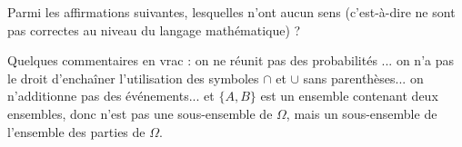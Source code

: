 {\begin{question}
Parmi les affirmations suivantes, lesquelles n'ont aucun sens (c'est-à-dire ne sont pas correctes au niveau du langage mathématique) ?
\begin{answers}
\end{answers}
\begin{explanations}
Quelques commentaires en vrac : on ne réunit pas des probabilités ... on n'a pas le droit d'enchaîner l'utilisation des symboles $\cap$ et $\cup$ sans parenthèses... on n'additionne pas des événements... et $\{ A,B\}$ est un ensemble contenant deux ensembles, donc n'est pas une sous-ensemble de $\Omega$, mais un sous-ensemble de l'ensemble des parties de $\Omega$.
\end{explanations}
\end{question}
}
